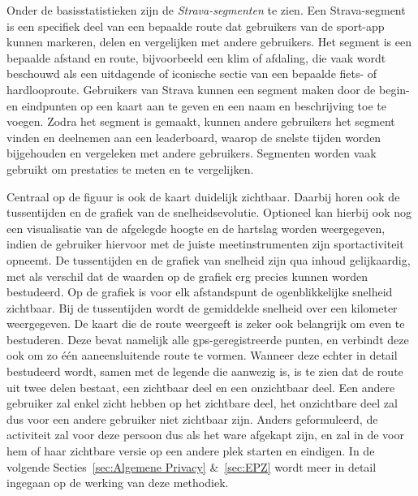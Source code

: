 Onder de basisstatistieken zijn de \textit{Strava-segmenten} te zien. Een
Strava-segment is een specifiek deel van een bepaalde route dat gebruikers van
de sport-app kunnen markeren, delen en vergelijken met andere gebruikers. Het
segment is een bepaalde afstand en route, bijvoorbeeld een klim of afdaling,
die vaak wordt beschouwd als een uitdagende of iconische sectie van een
bepaalde fiets- of hardlooproute. Gebruikers van Strava kunnen een segment
maken door de begin- en eindpunten op een kaart aan te geven en een naam en
beschrijving toe te voegen. Zodra het segment is gemaakt, kunnen andere
gebruikers het segment vinden en deelnemen aan een leaderboard, waarop de
snelste tijden worden bijgehouden en vergeleken met andere gebruikers.
Segmenten worden vaak gebruikt om prestaties te meten en te vergelijken.

Centraal op de figuur is ook de kaart duidelijk zichtbaar. Daarbij horen ook de
tussentijden en de grafiek van de snelheidsevolutie. Optioneel kan hierbij ook
nog een visualisatie van de afgelegde hoogte en de hartslag worden weergegeven,
indien de gebruiker hiervoor met de juiste meetinstrumenten zijn
sportactiviteit opneemt. De tussentijden en de grafiek van snelheid zijn qua
inhoud gelijkaardig, met als verschil dat de waarden op de grafiek erg precies
kunnen worden bestudeerd. Op de grafiek is voor elk afstandspunt de
ogenblikkelijke snelheid zichtbaar. Bij de tussentijden wordt de gemiddelde
snelheid over een kilometer weergegeven. De kaart die de route weergeeft is
zeker ook belangrijk om even te bestuderen. Deze bevat namelijk alle
\ac{gps}-geregistreerde punten, en verbindt deze ook om zo één aaneensluitende
route te vormen. Wanneer deze echter in detail bestudeerd wordt, samen met de
legende die aanwezig is, is te zien dat de route uit twee delen bestaat, een
zichtbaar deel en een onzichtbaar deel. Een andere gebruiker zal enkel zicht
hebben op het zichtbare deel, het onzichtbare deel zal dus voor een andere
gebruiker niet zichtbaar zijn. Anders geformuleerd, de activiteit zal voor deze
persoon dus als het ware afgekapt zijn, en zal in de voor hem of haar zichtbare
versie op een andere plek starten en eindigen. In de volgende
Secties~\ref{sec:Algemene Privacy} \&~\ref{sec:EPZ} wordt meer in detail
ingegaan op de werking van deze methodiek.

